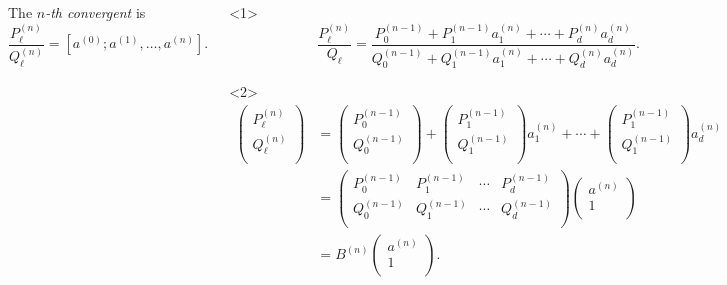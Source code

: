 \documentclass[aspectratio=169]{beamer}
\begin{document}
\begin{frame}
\begin{columns}[T]
    The \emph{$n$-th convergent} is \[
      \frac{P_ℓ^{(n)}}{Q_ℓ^{(n)}} = [a^{(0)}; a^{(1)}, …, a^{(n)}].
    \]
    \begin{lemma}
      \begin{onlyenv}<1>
        \[
          \frac{P_ℓ^{(n)}}{Q_ℓ}
          = \frac{P_0^{(n-1)} + P_1^{(n-1)} a_1^{(n)} + ⋯ + P_d^{(n)} a_d^{(n)}}
                 {Q_0^{(n-1)} + Q_1^{(n-1)} a_1^{(n)} + ⋯ + Q_d^{(n)} a_d^{(n)}}.
        \]
      \end{onlyenv}
      \begin{onlyenv}<2>
        \begin{align*}
          \begin{pmatrix}
            P_ℓ^{(n)} \\
            Q_ℓ^{(n)} \\
          \end{pmatrix}
          & = \begin{pmatrix}
            P_0^{(n-1)} \\
            Q_0^{(n-1)} \\
          \end{pmatrix} +
          \begin{pmatrix}
            P_1^{(n-1)} \\
            Q_1^{(n-1)} \\
          \end{pmatrix} a_1^{(n)} + ⋯ +
          \begin{pmatrix}
            P_1^{(n-1)} \\
            Q_1^{(n-1)} \\
          \end{pmatrix} a_d^{(n)} \\
          & = \begin{pmatrix}
            P_0^{(n-1)} & P_1^{(n-1)} & ⋯ & P_d^{(n-1)} \\
            Q_0^{(n-1)} & Q_1^{(n-1)} & ⋯ & Q_d^{(n-1)} \\
          \end{pmatrix}
          \begin{pmatrix}
            a^{(n)} \\
            1 \\
          \end{pmatrix} \\
          & = B^{(n)}
          \begin{pmatrix}
            a^{(n)} \\
            1 \\
          \end{pmatrix}.
        \end{align*}
      \end{onlyenv}
    \end{lemma}
  \end{columns}
\end{frame}
\end{document}
